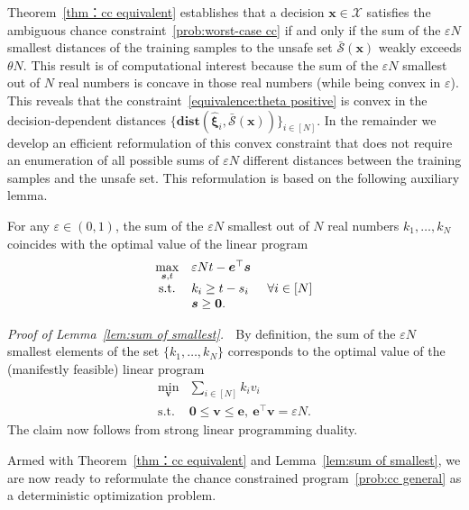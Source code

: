 \documentclass[nonblindrev]{informs2017}
\newcommand{\bmh}[1]{\hat{\bm{#1}}}
\newcommand{\1}[1]{\mathds{1}{\left(#1\right)}}
\begin{document}
Theorem~\ref{thm：cc equivalent} establishes that a decision $\bm{x} \in \mathcal{X}$ satisfies the ambiguous chance constraint~\eqref{prob:worst-case cc} if and only if 
the sum of the $\varepsilon N$ smallest distances of the training samples to the unsafe set $\bar{\mathcal{S}}(\bm{x})$ weakly exceeds $\theta N$. This result is of computational interest because the sum of the $\varepsilon N$ smallest out of $N$ real numbers is concave in those real numbers (while being convex in $\varepsilon$). This reveals that the  constraint~\eqref{equivalence:theta positive} is convex in the decision-dependent distances $\{\mathbf{dist}(\bmh{\xi}_{i}, \bar{\mathcal{S}}(\bm{x}))\}_{i \in [N]}$. In the remainder we develop an efficient reformulation of this convex constraint that does not require an enumeration of all possible sums of $\varepsilon N$ different distances between the training samples and the unsafe set. This reformulation is based on the following auxiliary lemma.

\begin{lemma}\label{lem:sum of smallest}
For any $\varepsilon \in (0,1)$, the sum of the $\varepsilon N$ smallest out of $N$ real numbers $k_1,\dots,k_N$ coincides with the optimal value of the linear program
$$
\begin{array}{cll}
\displaystyle \max_{\bm{s}, t} & \varepsilon N t - \bm{e}^\top\bm{s} \\
{\rm s.t.} & k_i \geq t - s_i &~\forall i \in [N] \\
& \bm{s} \geq \bm{0}.
\end{array}
$$
\end{lemma}
\noindent \emph{Proof of Lemma~\ref{lem:sum of smallest}.} $\;$
By definition, the sum of the $\varepsilon N$ smallest elements of the set $\{k_1,\dots,k_N\}$ corresponds to the optimal value of the (manifestly feasible) linear program
\begin{equation*}
\begin{array}{cl}
\displaystyle \min_{\bm{v}} & \displaystyle \sum_{i \in [N]} k_i v_i \\ \text{s.t.} & \bm{0} \leq \bm{v} \leq \bm{e}, ~\bm{e}^\top\bm{v} = \varepsilon N.
\end{array}
\end{equation*}
The claim now follows from strong linear programming duality.
\hfill \Halmos
\endproof 

Armed with Theorem~\ref{thm：cc equivalent} and Lemma~\ref{lem:sum of smallest}, we are now ready to reformulate the chance constrained program~\eqref{prob:cc general} as a deterministic optimization problem.
\end{document}
